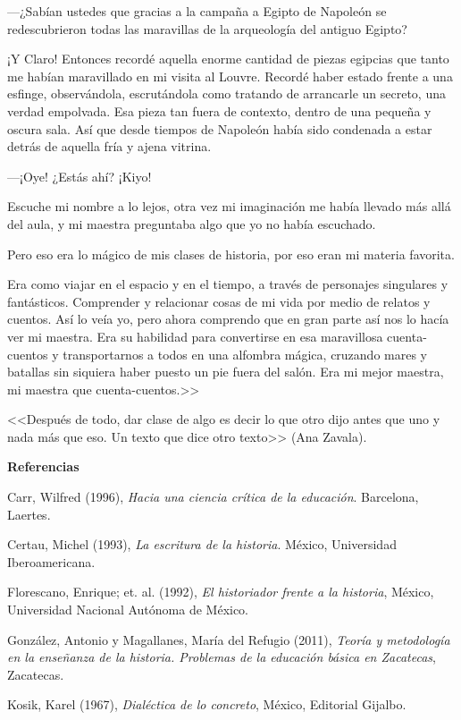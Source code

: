  
---¿Sabían ustedes que gracias a la campaña a Egipto de Napoleón se 
redescubrieron todas las maravillas de la arqueología del antiguo 
Egipto?

 
¡Y Claro! Entonces recordé aquella enorme cantidad de piezas egipcias 
que tanto me habían maravillado en mi visita al Louvre. Recordé haber 
estado frente a una esfinge, observándola, escrutándola como tratando 
de arrancarle un secreto, una verdad empolvada. Esa pieza tan fuera de 
contexto, dentro de una pequeña y oscura sala. Así que desde tiempos de 
Napoleón había sido condenada a estar detrás de aquella fría y ajena 
vitrina.

 
---¡Oye! ¿Estás ahí? ¡Kiyo!

 
Escuche mi nombre a lo lejos, otra vez mi imaginación me había llevado 
más allá del aula, y  mi maestra preguntaba algo que yo no había 
escuchado.

 
Pero eso era lo mágico de mis clases de historia, por eso eran mi 
materia favorita. 

 
Era como viajar en el espacio y en el tiempo, a través de personajes 
singulares y fantásticos. Comprender y relacionar cosas de mi vida por 
medio de relatos y cuentos. Así lo veía yo, pero ahora comprendo que en 
gran parte así nos lo hacía ver mi maestra. Era su habilidad para 
convertirse en esa maravillosa cuenta-cuentos y transportarnos a todos 
en una alfombra mágica, cruzando mares y batallas sin siquiera haber 
puesto un pie fuera del salón. Era mi mejor maestra, mi maestra que 
cuenta-cuentos.>>

 
<<Después de todo, dar clase de algo es decir lo que otro dijo antes que 
uno y nada más que eso. Un texto que dice otro texto>> (Ana Zavala).


\bigskip
\textbf{Referencias}
\enlargethispage{1\baselineskip}
 
Carr, Wilfred (1996), \textit{Hacia una ciencia crítica de la educación}. 
Barcelona, Laertes. 

 
Certau, Michel (1993), \textit{La escritura de la historia}. México,
Universidad Iberoamericana.

 
Florescano, Enrique; et\@.  al\@. (1992), \textit{El historiador frente a la 
historia}, México, Universidad Nacional Autónoma de México.

 
González, Antonio y Magallanes, María del Refugio (2011), \textit{Teoría y 
metodología en la enseñanza de la historia. Problemas de la educación 
básica en Zacatecas}, Zacatecas.

 
Kosik, Karel (1967), \textit{Dialéctica de lo concreto}, México, 
Editorial Gijalbo.

